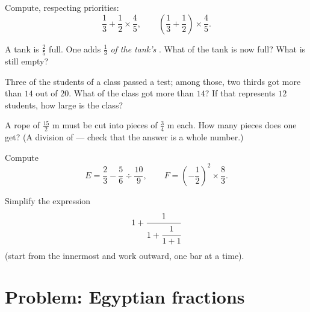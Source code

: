 \begin{exercise}[$\star$]\label{exo:g8:fractions:7}
Compute, respecting priorities:
\[
\frac{1}{3} + \frac{1}{2} \times \frac{4}{5},
\qquad
\left(\frac{1}{3} + \frac{1}{2}\right) \times \frac{4}{5} .
\]
\end{exercise}

\begin{exercise}[$\star\star$]\label{exo:g8:fractions:8}
A tank is $\frac{2}{5}$ full. One adds $\frac{1}{3}$ \emph{of the
tank's }. What  of the tank is now full? What
 is still empty?
\end{exercise}

\begin{exercise}[$\star\star$]\label{exo:g8:fractions:9}
Three  of the students of a class passed a test; among those,
two thirds got more than $14$ out of $20$. What  of the class
got more than $14$? If that represents $12$ students, how large is
the class?
\end{exercise}

\begin{exercise}[$\star\star$]\label{exo:g8:fractions:10}
A rope of $\frac{15}{2}$ m must be cut into pieces of $\frac{3}{4}$ m
each. How many pieces does one get? (A division of  ---
check that the answer is a whole number.)
\end{exercise}

\begin{exercise}[$\star\star$]\label{exo:g8:fractions:11}
Compute
\[
E = \frac{2}{3} - \frac{5}{6} \div \frac{10}{9},
\qquad
F = \left(-\frac{1}{2}\right)^2 \times \frac{8}{3} .
\]
\end{exercise}

\begin{exercise}[$\star\star\star$]\label{exo:g8:fractions:12}
Simplify the expression
\[
1 + \cfrac{1}{1 + \cfrac{1}{1 + 1}}
\]
(start from the innermost  and work outward, one bar at a
time).
\end{exercise}

\section{Problem: Egyptian fractions}

